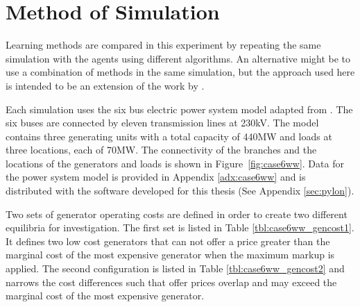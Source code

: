 \section{Method of Simulation}
Learning methods are compared in this experiment by repeating the same
simulation with the agents using different algorithms.  An alternative
might be to use a combination of methods in the same simulation, but the
approach used here is intended to be an extension of the work by
.

Each simulation uses the six bus electric power system model adapted from
.  The six buses are
connected by eleven transmission lines at 230kV.  The model contains three
generating units with a total capacity of 440MW and loads at three locations, each of
70MW. The connectivity of the branches and the locations of the generators and
loads is shown in Figure~\ref{fig:case6ww}.  Data for the power system model is
provided in Appendix \ref{adx:case6ww} and is distributed with the software
developed for this thesis (See Appendix \ref{sec:pylon}).

Two sets of generator operating costs are defined in order to create two
different equilibria for investigation. The first set is listed in Table
\ref{tbl:case6ww_gencost1}. It defines two low cost generators that can not
offer a price greater than the marginal cost of the most expensive generator
when the maximum markup is applied.  The second configuration is listed in
Table \ref{tbl:case6ww_gencost2} and narrows the cost differences such that
offer prices overlap and may exceed the marginal cost of the most expensive
generator.

